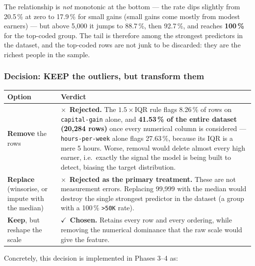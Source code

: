 \documentclass[11pt,a4paper]{article}
\newcommand{\yes}{\textcolor{hdr}{$\checkmark$}}
\newcommand{\no}{\textcolor{acc}{$\times$}}
\newcommand{\code}[1]{\texttt{\small #1}}
\begin{document}
\noindent
The relationship is \emph{not} monotonic at the bottom --- the rate dips slightly from
20.5\,\% at zero to 17.9\,\% for small gains (small gains come mostly from modest earners)
--- but above 5{,}000 it jumps to 88.7\,\%, then 92.7\,\%, and reaches \textbf{100\,\%} for
the top-coded group. The tail is therefore among the strongest predictors in the dataset,
and the top-coded rows are not junk to be discarded: they are the richest people in the
sample.

\subsubsection*{Decision: \textbf{KEEP} the outliers, but transform them}

\begin{table}[H]
\centering
\small
\begin{adjustbox}{max width=\linewidth}
\begin{tabular}{L{3.8cm}L{12.0cm}}
\toprule
\textbf{Option} & \textbf{Verdict} \\
\midrule
\textbf{Remove} the rows &
\no~\textbf{Rejected.} The $1.5\times$IQR rule flags 8.26\,\% of rows on
\code{capital-gain} alone, and \textbf{41.53\,\% of the entire dataset (20{,}284 rows)}
once every numerical column is considered --- \code{hours-per-week} alone flags 27.63\,\%,
because its IQR is a mere 5 hours. Worse, removal would delete almost every high earner,
i.e.\ exactly the signal the model is being built to detect, biasing the target
distribution. \\
\textbf{Replace} (winsorise, or impute with the median) &
\no~\textbf{Rejected as the primary treatment.} These are not measurement errors.
Replacing 99{,}999 with the median would destroy the single strongest predictor in the
dataset (a group with a 100\,\% \code{>50K} rate). \\
\textbf{Keep}, but reshape the scale &
\yes~\textbf{Chosen.} Retains every row and every ordering, while removing the numerical
dominance that the raw scale would give the feature. \\
\bottomrule
\end{tabular}
\end{adjustbox}
\end{table}

\noindent
Concretely, this decision is implemented in Phases 3--4 as:
\end{document}
